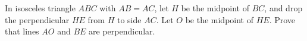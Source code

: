 In isosceles triangle $ABC$ with $AB=AC$, let $H$ be the midpoint of $BC$, and drop the perpendicular $HE$ from $H$ to side $AC$. Let $O$ be the midpoint of $HE$. Prove that lines $AO$ and $BE$ are perpendicular.
